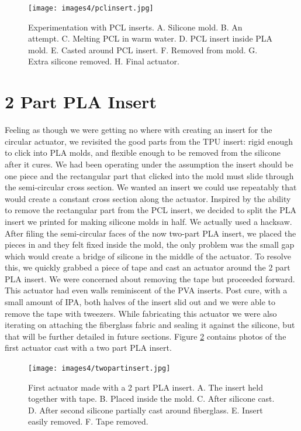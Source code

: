 \begin{figure}[h]
    \centering
    \texttt{[image: images4/pclinsert.jpg]}
    \caption{Experimentation with PCL inserts. A. Silicone mold. B. An attempt. C. Melting PCL in warm water. D. PCL insert inside PLA mold. E. Casted around PCL insert. F. Removed from mold. G. Extra silicone removed. H. Final actuator.}
    \label{fig:pclinsert}
\end{figure}

\section{2 Part PLA Insert}
Feeling as though we were getting no where with creating an insert for the circular actuator, we revisited the good parts from the TPU insert: rigid enough to click into PLA molds, and flexible enough to be removed from the silicone after it cures. We had been operating under the assumption the insert should be one piece and the rectangular part that clicked into the mold must slide through the semi-circular cross section. We wanted an insert we could use repeatably that would create a constant cross section along the actuator. Inspired by the ability to remove the rectangular part from the PCL insert, we decided to split the PLA insert we printed for making silicone molds in half. We actually used a hacksaw. After filing the semi-circular faces of the now two-part PLA insert, we placed the pieces in and they felt fixed inside the mold, the only problem was the small gap which would create a bridge of silicone in the middle of the actuator. To resolve this, we quickly grabbed a piece of tape and cast an actuator around the 2 part PLA insert. We were concerned about removing the tape but proceeded forward. This actuator had even walls reminiscent of the PVA inserts. Post cure, with a small amount of IPA, both halves of the insert slid out and we were able to remove the tape with tweezers. While fabricating this actuator we were also iterating on attaching the fiberglass fabric and sealing it against the silicone, but that will be further detailed in future sections. Figure \ref{fig:twopartinsert} contains photos of the first actuator cast with a two part PLA insert. 

\begin{figure}[h]
    \centering
    \texttt{[image: images4/twopartinsert.jpg]}
    \caption{First actuator made with a 2 part PLA insert. A. The insert held together with tape. B. Placed inside the mold. C. After silicone cast. D. After second silicone partially cast around fiberglass. E. Insert easily removed. F. Tape removed.}
    \label{fig:twopartinsert}
\end{figure}

